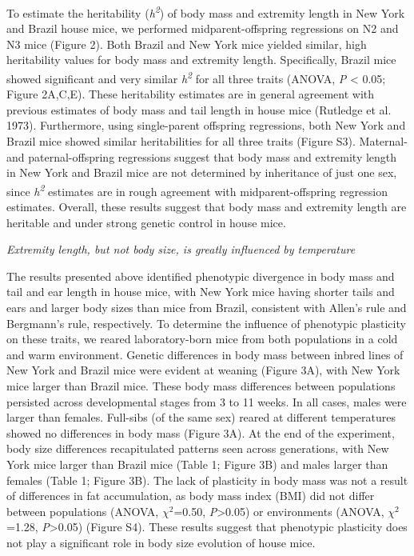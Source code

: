 \documentclass[
]{article}
\begin{document}
To estimate the heritability (\emph{h\textsuperscript{2}}) of body mass
and extremity length in New York and Brazil house mice, we performed
midparent-offspring regressions on N2 and N3 mice (Figure 2). Both
Brazil and New York mice yielded similar, high heritability values for
body mass and extremity length. Specifically, Brazil mice showed
significant and very similar \emph{h\textsuperscript{2}} for all three
traits (ANOVA, \emph{P} \textless{} 0.05; Figure 2A,C,E). These
heritability estimates are in general agreement with previous estimates
of body mass and tail length in house mice (Rutledge et al. 1973).
Furthermore, using single-parent offspring regressions, both New York
and Brazil mice showed similar heritabilities for all three traits
(Figure S3). Maternal- and paternal-offspring regressions suggest that
body mass and extremity length in New York and Brazil mice are not
determined by inheritance of just one sex, since
\emph{h\textsuperscript{2}} estimates are in rough agreement with
midparent-offspring regression estimates. Overall, these results suggest
that body mass and extremity length are heritable and under strong
genetic control in house mice.

\vspace{3.5mm}

\noindent\emph{Extremity length, but not body size, is greatly
influenced by temperature}

The results presented above identified phenotypic divergence in body
mass and tail and ear length in house mice, with New York mice having
shorter tails and ears and larger body sizes than mice from Brazil,
consistent with Allen's rule and Bergmann's rule, respectively. To
determine the influence of phenotypic plasticity on these traits, we
reared laboratory-born mice from both populations in a cold and warm
environment. Genetic differences in body mass between inbred lines of
New York and Brazil mice were evident at weaning (Figure 3A), with New
York mice larger than Brazil mice. These body mass differences between
populations persisted across developmental stages from 3 to 11 weeks. In
all cases, males were larger than females. Full-sibs (of the same sex)
reared at different temperatures showed no differences in body mass
(Figure 3A). At the end of the experiment, body size differences
recapitulated patterns seen across generations, with New York mice
larger than Brazil mice (Table 1; Figure 3B) and males larger than
females (Table 1; Figure 3B). The lack of plasticity in body mass was
not a result of differences in fat accumulation, as body mass index
(BMI) did not differ between populations (ANOVA, \(\chi^2\)=0.50,
\emph{P}\textgreater0.05) or environments (ANOVA, \(\chi^2\)=1.28,
\emph{P}\textgreater0.05) (Figure S4). These results suggest that
phenotypic plasticity does not play a significant role in body size
evolution of house mice.
\end{document}
